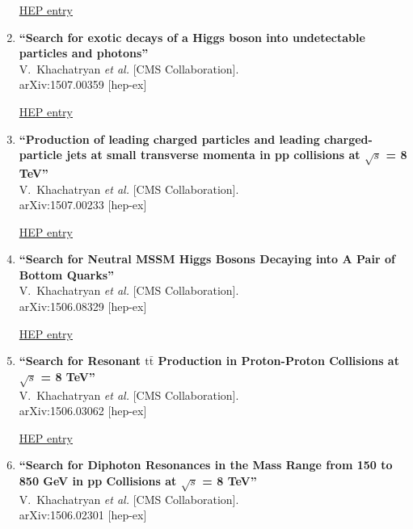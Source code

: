 \documentclass{article}
\begin{document}
\begin{enumerate}
\href{http://inspirehep.net/record/1382346}{HEP entry}


\item%
{\bf ``Search for exotic decays of a Higgs boson into undetectable particles and photons''}
  \\{}V.~Khachatryan {\it et al.} [CMS Collaboration].
  \\{}arXiv:1507.00359 [hep-ex]
  
\href{http://inspirehep.net/record/1380907}{HEP entry}


\item%
{\bf ``Production of leading charged particles and leading charged-particle jets at small transverse momenta in pp collisions at $\sqrt{s}$ = 8 TeV''}
  \\{}V.~Khachatryan {\it et al.} [CMS Collaboration].
  \\{}arXiv:1507.00233 [hep-ex]
  
\href{http://inspirehep.net/record/1380605}{HEP entry}


\item%
{\bf ``Search for Neutral MSSM Higgs Bosons Decaying into A Pair of Bottom Quarks''}
  \\{}V.~Khachatryan {\it et al.} [CMS Collaboration].
  \\{}arXiv:1506.08329 [hep-ex]
  
\href{http://inspirehep.net/record/1380177}{HEP entry}


\item%
{\bf ``Search for Resonant $\mathrm{t\bar{t}}$ Production in Proton-Proton Collisions at $\sqrt{s}$ = 8 TeV''}
  \\{}V.~Khachatryan {\it et al.} [CMS Collaboration].
  \\{}arXiv:1506.03062 [hep-ex]
  
\href{http://inspirehep.net/record/1375314}{HEP entry}


\item%
{\bf ``Search for Diphoton Resonances in the Mass Range from 150 to 850 GeV in pp Collisions at $\sqrt{s}$ = 8 TeV''}
  \\{}V.~Khachatryan {\it et al.} [CMS Collaboration].
  \\{}arXiv:1506.02301 [hep-ex]
  

\end{enumerate}
\end{document}

